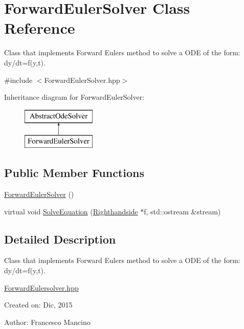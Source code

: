 \hypertarget{class_forward_euler_solver}{}\section{Forward\+Euler\+Solver Class Reference}
\label{class_forward_euler_solver}


Class that implements Forward Eulers method to solve a O\+D\+E of the form\+: dy/dt=f(y,t).  




{\ttfamily \#include $<$Forward\+Euler\+Solver.\+hpp$>$}

Inheritance diagram for Forward\+Euler\+Solver\+:\begin{figure}[H]
\begin{center}
\leavevmode
\includegraphics[height=2.000000cm]{class_forward_euler_solver}
\end{center}
\end{figure}
\subsection*{Public Member Functions}
\begin{DoxyCompactItemize}
\item 
\hyperlink{class_forward_euler_solver_a56271b4e9c08874b64e20981f4004294}{Forward\+Euler\+Solver} ()
\item 
virtual void \hyperlink{class_forward_euler_solver_af1d0ccddde281d136a99362743c80fe7}{Solve\+Equation} (\hyperlink{class_righthandside}{Righthandside} $\ast$f, std\+::ostream \&stream)
\end{DoxyCompactItemize}


\subsection{Detailed Description}
Class that implements Forward Eulers method to solve a O\+D\+E of the form\+: dy/dt=f(y,t). 

\hyperlink{_forward_euler_solver_8hpp_source}{Forward\+Eulersolver.\+hpp}

Created on\+: Dic, 2015 \begin{DoxyVerb}Author: Francesco Mancino
\end{DoxyVerb}


